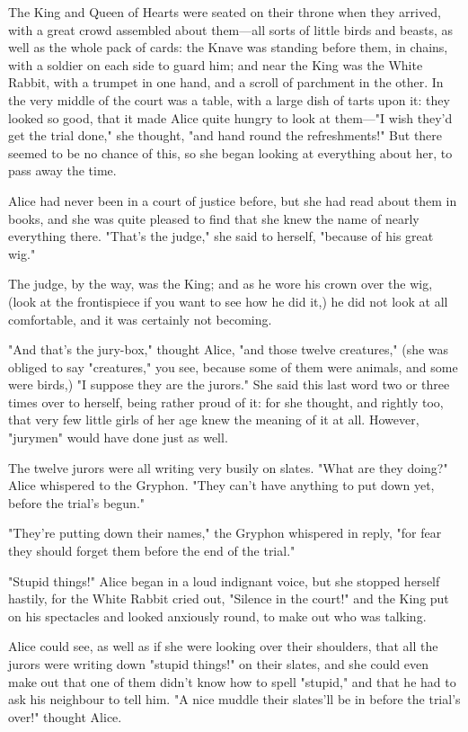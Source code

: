 The King and Queen of Hearts were seated on their throne when they arrived, with a great crowd assembled about them—all sorts of little birds and beasts, as well as the whole pack of cards: the Knave was standing before them, in chains, with a soldier on each side to guard him; and near the King was the White Rabbit, with a trumpet in one hand, and a scroll of parchment in the other. In the very middle of the court was a table, with a large dish of ​tarts upon it: they looked so good, that it made Alice quite hungry to look at them—"I wish they'd get the trial done," she thought, "and hand round the refreshments!" But there seemed to be no chance of this, so she began looking at everything about her, to pass away the time.

Alice had never been in a court of justice before, but she had read about them in books, and she was quite pleased to find that she knew the name of nearly everything there. "That's the judge," she said to herself, "because of his great wig."

The judge, by the way, was the King; and as he wore his crown over the wig, (look at the frontispiece if you want to see how he did it,) he did not look at all comfortable, and it was certainly not becoming.

"And that's the jury-box," thought Alice, "and those twelve creatures," (she was obliged to say "creatures," you see, because some of them were animals, and some were birds,) "I ​suppose they are the jurors." She said this last word two or three times over to herself, being rather proud of it: for she thought, and rightly too, that very few little girls of her age knew the meaning of it at all. However, "jurymen" would have done just as well.

The twelve jurors were all writing very busily on slates. "What are they doing?" Alice whispered to the Gryphon. "They can't have anything to put down yet, before the trial's begun."

"They're putting down their names," the Gryphon whispered in reply, "for fear they should forget them before the end of the trial."

"Stupid things!" Alice began in a loud indignant voice, but she stopped herself hastily, for the White Rabbit cried out, "Silence in the court!" and the King put on his spectacles and looked anxiously round, to make out who was talking.

Alice could see, as well as if she were looking over their shoulders, that all the jurors were ​writing down "stupid things!" on their slates, and she could even make out that one of them didn't know how to spell "stupid," and that he had to ask his neighbour to tell him. "A nice muddle their slates'll be in before the trial's over!" thought Alice.

